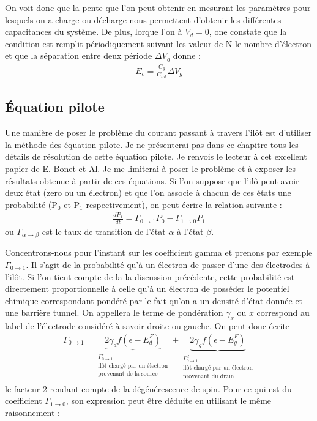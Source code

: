 On voit donc que la pente que l'on peut obtenir en mesurant les paramètres pour lesquels on a charge ou décharge nous permettent d'obtenir les différentes capacitances du système. De plus, lorque l'on à $V_d=0$, one constate que la condition est remplit périodiquement suivant les valeur de N le nombre d'électron et que la séparation entre deux période $\Delta V_g$ donne :
\begin{eqnarray}
E_c = \frac{C_g}{C_{tot}}\Delta V_g
\end{eqnarray}


\subsection{\'Equation pilote}
Une manière de poser le problème du courant passant à travers l'il\^ot est d'utiliser la méthode des équation pilote. Je ne présenterai pas dans ce chapitre tous les détails de résolution de cette équation pilote. Je renvois le lecteur à cet excellent papier de E. Bonet et Al. Je me limiterai à poser le problème et à exposer les résultats obtenue à partir de ces équations.
Si l'on suppose que l'il\^o peut avoir deux état (zero ou un électron) et que l'on associe à chacun de ces états une probabilité (P$_0$ et P$_1$ respectivement), on peut écrire la relation suivante :
\begin{eqnarray}
\frac{dP_1}{dt} = \Gamma_{0 \rightarrow 1}P_0 - \Gamma_{1 \rightarrow 0}P_1
\end{eqnarray}
ou $\Gamma_{\alpha \rightarrow \beta}$ est le taux de transition de l'état $\alpha$ à l'état $\beta$.

Concentrons-nous pour l'instant sur les coefficient gamma et prenons par exemple $\Gamma_{0 \rightarrow 1}$. Il s'agit de la probabilité qu'à un électron de passer d'une des électrodes à l'il\^ot. Si l'on tient compte de la la discussion précédente, cette probabilité est directement proportionnelle à celle qu'à un électron de posséder le potentiel chimique correspondant pondéré par le fait qu'on a un densité d'état donnée et une barrière tunnel. On appellera le terme de pondération $\gamma_x$ ou $x$ correspond au label de l'électrode considéré à savoir droite ou gauche. On peut donc écrite 
\begin{eqnarray}
\Gamma_{0 \rightarrow 1} = 
\underbrace{2\gamma_d f(\epsilon - E_d^F)}_{\substack{{\Gamma_{0 \rightarrow 1}^s}\\\text{il\^ot chargé par un électron}\\\text{provenant de la source}}}
+ 
\underbrace{2\gamma_g f(\epsilon - E_g^F)}_{\substack{{\Gamma_{0 \rightarrow 1}^d}\\\text{il\^ot chargé par un électron}\\\text{provenant du drain}}}
\end{eqnarray}
le facteur 2 rendant compte de la dégénérescence de spin. Pour ce qui est du coefficient $\Gamma_{1 \rightarrow 0}$, son expression peut être déduite en utilisant le même raisonnement :

